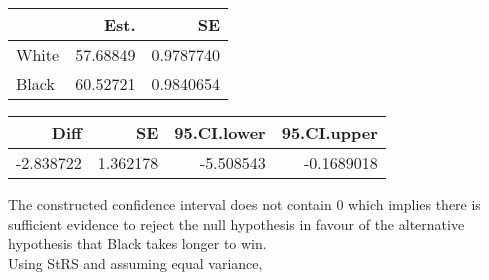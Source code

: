 \documentclass[11pt,]{article}
\begin{document}
\begin{table}[h] \centering  
\begin{tabular}{l|r|r}
\hline
  & Est. & SE\\
\hline
White & 57.68849 & 0.9787740\\
\hline
Black & 60.52721 & 0.9840654\\
\hline
\end{tabular} \hspace{1cm} \centering  
\begin{tabular}{r|r|r|r}
\hline
Diff & SE & 95.CI.lower & 95.CI.upper\\
\hline
-2.838722 & 1.362178 & -5.508543 & -0.1689018\\
\hline
\end{tabular} \end{table}

The constructed confidence interval does not contain 0 which implies
there is sufficient evidence to reject the null hypothesis in favour of
the alternative hypothesis that Black takes longer to win.\\
\newline Using StRS and assuming equal variance,
\end{document}

